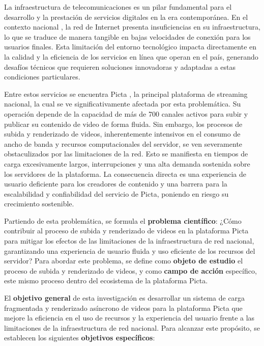 \introduction

La infraestructura de telecomunicaciones es un pilar fundamental para el desarrollo y la prestación
de servicios digitales en la era contemporánea. En el contexto nacional \citep{Press2011, Hernandez2021},
la red de Internet presenta insuficiencias en su infraestructura, lo que se traduce de manera tangible
en bajas velocidades de conexión para los usuarios finales. Esta limitación del entorno tecnológico
impacta directamente en la calidad y la eficiencia de los servicios en línea que operan en el país,
generando desafíos técnicos que requieren soluciones innovadoras y adaptadas a estas condiciones
particulares.

Entre estos servicios se encuentra Picta \citep{UCI2025}, la principal plataforma de
streaming nacional, la cual se ve significativamente afectada por esta problemática. Su operación
depende de la capacidad de más de 700 canales activos para subir y publicar su contenido de video de
forma fluida. Sin embargo, los procesos de subida y renderizado de videos, inherentemente intensivos
en el consumo de ancho de banda y recursos computacionales del servidor, se ven severamente
obstaculizados por las limitaciones de la red. Esto se manifiesta en tiempos de carga excesivamente
largos, interrupciones y una alta demanda sostenida sobre los servidores de la plataforma. La
consecuencia directa es una experiencia de usuario deficiente para los creadores de contenido y una
barrera para la escalabilidad y confiabilidad del servicio de Picta, poniendo en riesgo su crecimiento
sostenible.

Partiendo de esta problemática, se formula el \textbf{problema científico}: ¿Cómo contribuir al proceso 
de subida y renderizado de videos en la plataforma Picta para mitigar los efectos de las limitaciones de 
la infraestructura de red nacional, garantizando una experiencia de usuario fluida y uso eficiente de los 
recursos del servidor? Para abordar este problema, se define como \textbf{objeto de estudio} el proceso 
de subida y renderizado de videos, y como \textbf{campo de acción} específico, este mismo proceso dentro 
del ecosistema de la plataforma Picta.

El \textbf{objetivo general} de esta investigación es desarrollar un sistema de carga fragmentada y 
renderizado asíncrono de videos para la plataforma Picta que mejore la eficiencia en el uso de recursos 
y la experiencia del usuario frente a las limitaciones de la infraestructura de red nacional. Para alcanzar 
este propósito, se establecen los siguientes \textbf{objetivos específicos}:

